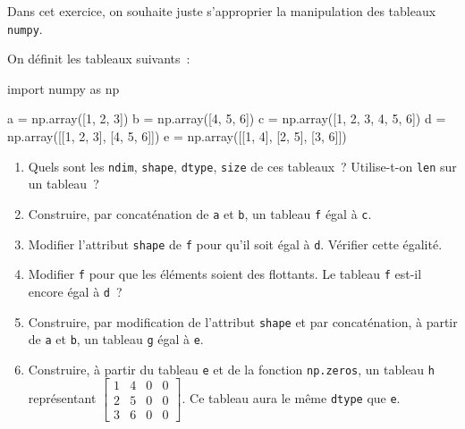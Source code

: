 
Dans cet exercice, on souhaite juste s'approprier la manipulation des
tableaux \texttt{numpy}.

On définit les tableaux suivants~: 
\begin{python}
import numpy as np

a = np.array([1, 2, 3])
b = np.array([4, 5, 6])  
c = np.array([1, 2, 3, 4, 5, 6])
d = np.array([[1, 2, 3],
              [4, 5, 6]])
e = np.array([[1, 4],
              [2, 5],
              [3, 6]])
\end{python}

\begin{enumerate}
\item 
  Quels sont les \texttt{ndim}, \texttt{shape}, \texttt{dtype}, \texttt{size} de ces
  tableaux~? Utilise-t-on \texttt{len} sur un tableau~? 
\item 
  Construire, par concaténation de \verb#a# et \verb#b#, un tableau \verb#f#
  égal à \verb#c#.
\item 
  Modifier l'attribut \texttt{shape} de \verb#f# pour qu'il soit égal
  à \verb#d#. Vérifier cette égalité. 
\item
  Modifier \verb#f# pour que les éléments
  soient des flottants. Le tableau \verb#f# est-il encore égal à \verb#d#~?
\item 
  Construire, par modification de l'attribut \texttt{shape} et par
  concaténation, à partir de \verb#a# et \verb#b#, un tableau \verb#g#
  égal à \verb#e#.
\item 
  Construire, à partir du tableau \verb#e# et de la fonction
  \texttt{np.zeros}, un tableau \verb#h# représentant 
  $
  \begin{bmatrix}
    1 & 4 & 0 & 0 \\
    2 & 5 & 0 & 0 \\
    3 & 6 & 0 & 0 
  \end{bmatrix}$. 
  Ce tableau aura le même \texttt{dtype} que \verb#e#. 
  
\end{enumerate}
